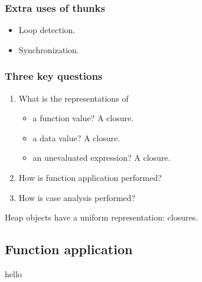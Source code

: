 \documentclass{beamer}
\begin{document}
\begin{frame}
    \frametitle{Extra uses of thunks}

    \begin{itemize}
        \item Loop detection.
        \item Synchronization.
    \end{itemize}
\end{frame}

\begin{frame}
    \frametitle{Three key questions}

    \begin{enumerate}
        \item What is the representations of
            \begin{itemize}
                \item a function value? \alert{A closure.}
                \item a data value? \alert{A closure.}
                \item an unevaluated expression? \alert{A closure.}
            \end{itemize}

        \item How is function application performed?

        \item How is case analysis performed?
    \end{enumerate}

    \pause

    \huge{Heap objects have a uniform representation: \alert{closures}.}
\end{frame}

\subsection{Function application}


\begin{frame}
    hello
\end{frame}
\end{document}
